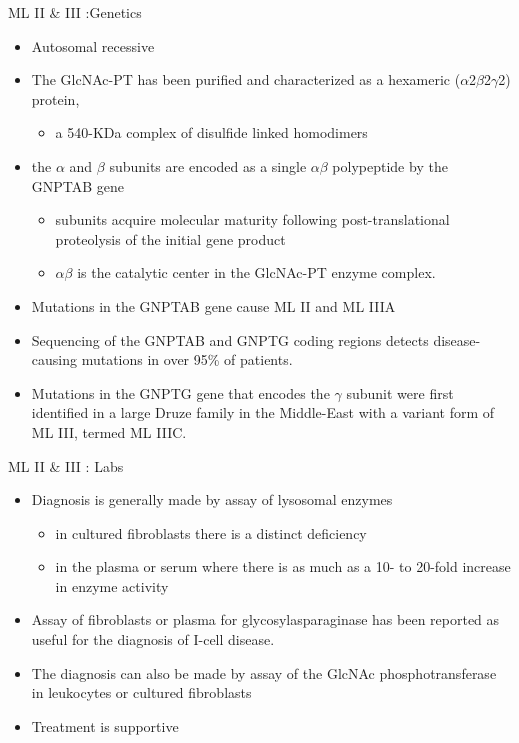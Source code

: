 \documentclass[presentation, smaller]{beamer}
\begin{document}
\begin{frame}[label={sec:orgheadline9}]{ML II \& III :Genetics}
\begin{itemize}
\item Autosomal recessive
\item The GlcNAc-PT has been purified and characterized as a hexameric
(\(\alpha\)2\(\beta\)2\(\gamma\)2) protein,
\begin{itemize}
\item a 540-KDa complex of disulfide linked homodimers
\end{itemize}
\item the \(\alpha\) and \(\beta\) subunits are encoded as a single \(\alpha \beta\) polypeptide by the GNPTAB gene
\begin{itemize}
\item subunits acquire molecular maturity following post-translational proteolysis of the initial gene product
\item \(\alpha \beta\) is the catalytic center in the GlcNAc-PT enzyme complex.
\end{itemize}
\item Mutations in the GNPTAB gene cause ML II and ML IIIA
\item Sequencing of the GNPTAB and GNPTG coding regions detects
disease-causing mutations in over 95\% of patients.
\item Mutations in the GNPTG gene that encodes the \(\gamma\) subunit were
first identified in a large Druze family in the Middle-East with a
variant form of ML III, termed ML IIIC.
\end{itemize}
\end{frame}


\begin{frame}[label={sec:orgheadline10}]{ML II \& III : Labs}
\begin{itemize}
\item Diagnosis is generally made by assay of lysosomal enzymes
\begin{itemize}
\item in cultured fibroblasts there is a distinct deficiency
\item in the plasma or serum where there is as much as a 10- to 20-fold increase in enzyme activity
\end{itemize}
\item Assay of fibroblasts or plasma for glycosylasparaginase has been
reported as useful for the diagnosis of I-cell disease.
\item The diagnosis can also be made by assay of the GlcNAc
phosphotransferase in leukocytes or cultured fibroblasts
\end{itemize}


\begin{itemize}
\item Treatment is supportive
\end{itemize}
\end{frame}
\end{document}
